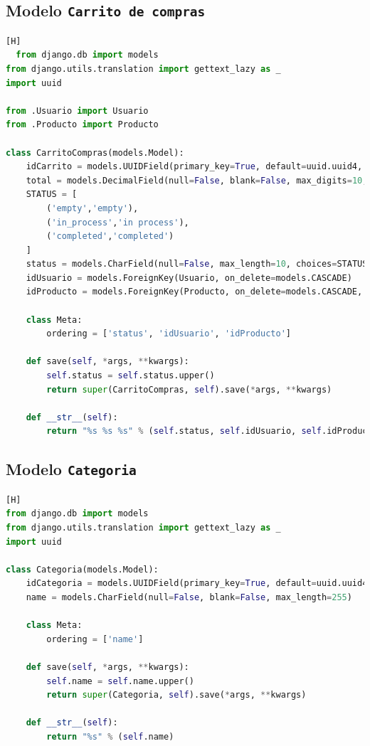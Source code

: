 \documentclass{article}
\begin{document}
\subsection*{Modelo \texttt{Carrito de compras}}
		  \begin{lstlisting}[language=Python,caption={CarritoCompras.py}][H]
  from django.db import models
from django.utils.translation import gettext_lazy as _
import uuid

from .Usuario import Usuario
from .Producto import Producto

class CarritoCompras(models.Model):
    idCarrito = models.UUIDField(primary_key=True, default=uuid.uuid4, editable=False)
    total = models.DecimalField(null=False, blank=False, max_digits=10, decimal_places=2, default=0)
    STATUS = [
        ('empty','empty'),
        ('in_process','in process'),
        ('completed','completed')
    ]
    status = models.CharField(null=False, max_length=10, choices=STATUS, default='empty')
    idUsuario = models.ForeignKey(Usuario, on_delete=models.CASCADE)
    idProducto = models.ForeignKey(Producto, on_delete=models.CASCADE, blank=True, null=True)

    class Meta:
        ordering = ['status', 'idUsuario', 'idProducto']

    def save(self, *args, **kwargs):
        self.status = self.status.upper()
        return super(CarritoCompras, self).save(*args, **kwargs)

    def __str__(self):
        return "%s %s %s" % (self.status, self.idUsuario, self.idProducto)
    \end{lstlisting}

\subsection*{Modelo \texttt{Categoria}}
		  \begin{lstlisting}[language=Python,caption={Categoria.py}][H]
from django.db import models
from django.utils.translation import gettext_lazy as _
import uuid

class Categoria(models.Model):
    idCategoria = models.UUIDField(primary_key=True, default=uuid.uuid4, editable=False)
    name = models.CharField(null=False, blank=False, max_length=255)

    class Meta:
        ordering = ['name']

    def save(self, *args, **kwargs):
        self.name = self.name.upper()
        return super(Categoria, self).save(*args, **kwargs)

    def __str__(self):
        return "%s" % (self.name)
    \end{lstlisting}
\end{document}
